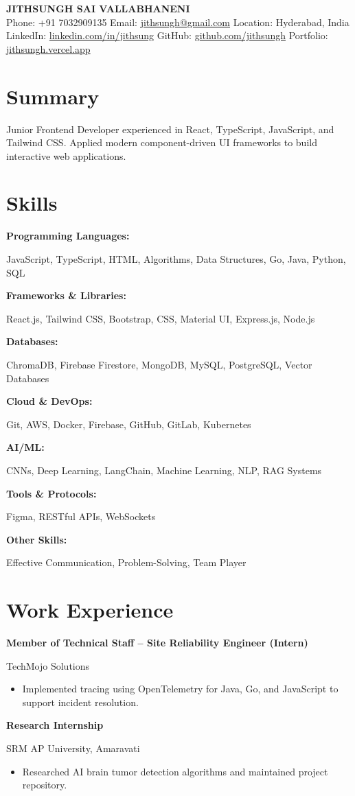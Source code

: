 \documentclass[a4paper,10pt]{article}
\newcommand{\tworow}[2]{%
  \noindent%
  \begin{minipage}[t]{0.615\textwidth}\raggedright #1\end{minipage}%
  \hfill%
  \begin{minipage}[t]{0.365\textwidth}\raggedleft #2\end{minipage}%
  \par%
}
\newcommand{\resumeheader}[3]{%
  \begin{center}
    {\LARGE \textbf{#1}} \\[0.5em]
    \small #2 \\[0.3em]
    \small #3
  \end{center}
}
\newcommand{\expentry}[3]{%
  \tworow{\textbf{#1}}{#2}%
  \ifx\relax#3\relax\else\textit{\small #3}\par\fi
}
\newenvironment{rbullets}{%
  \vspace{0.12em}%
  \begin{itemize}[leftmargin=1.1em, labelsep=0.4em, label=\textbullet,
                  itemsep=0.12em, topsep=0.08em, parsep=0pt, partopsep=0pt]%
}{%
  \end{itemize}%
}
\newcommand{\entrygap}{\vspace{0.55em}}
\newcommand{\skillrow}[2]{%
  \noindent%
  \begin{minipage}[t]{0.27\textwidth}\raggedright\textbf{#1}\end{minipage}%
  \begin{minipage}[t]{0.73\textwidth}\raggedright #2\end{minipage}%
  \par\vspace{0.18em}%
}
\begin{document}
\resumeheader{JITHSUNGH SAI VALLABHANENI}{%
  Phone: +91 7032909135 \quad  Email: \href{mailto:jithsungh@gmail.com}{jithsungh@gmail.com} \quad  Location: Hyderabad, India }{%
  LinkedIn: \href{https://linkedin.com/in/jithsung}{linkedin.com/in/jithsung} \quad  GitHub: \href{https://github.com/jithsungh}{github.com/jithsungh} \quad  Portfolio: \href{https://jithsungh.vercel.app}{jithsungh.vercel.app} }

\section*{Summary}
Junior Frontend Developer experienced in React, TypeScript, JavaScript, and Tailwind CSS. Applied modern component-driven UI frameworks to build interactive web applications.

\section*{Skills}
\skillrow{Programming Languages:}{JavaScript, TypeScript, HTML, Algorithms, Data Structures, Go, Java, Python, SQL}
\skillrow{Frameworks \& Libraries:}{React.js, Tailwind CSS, Bootstrap, CSS, Material UI, Express.js, Node.js}
\skillrow{Databases:}{ChromaDB, Firebase Firestore, MongoDB, MySQL, PostgreSQL, Vector Databases}
\skillrow{Cloud \& DevOps:}{Git, AWS, Docker, Firebase, GitHub, GitLab, Kubernetes}
\skillrow{AI/ML:}{CNNs, Deep Learning, LangChain, Machine Learning, NLP, RAG Systems}
\skillrow{Tools \& Protocols:}{Figma, RESTful APIs, WebSockets}
\skillrow{Other Skills:}{Effective Communication, Problem-Solving, Team Player}

\section*{Work Experience}
\expentry{Member of Technical Staff -- Site Reliability Engineer (Intern)}{TechMojo Solutions}{}
\begin{rbullets}
  \item Implemented tracing using OpenTelemetry for Java, Go, and JavaScript to support incident resolution.
\end{rbullets}
\entrygap
\expentry{Research Internship}{SRM AP University, Amaravati}{}
\begin{rbullets}
  \item Researched AI brain tumor detection algorithms and maintained project repository.
\end{rbullets}
\end{document}
